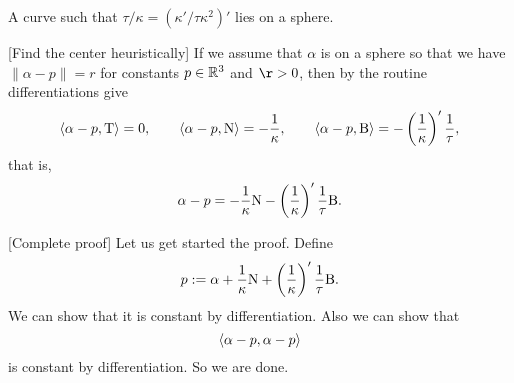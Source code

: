 \documentclass{../exp}
\def\a{\alpha}
\begin{document}
\begin{prb}
A curve such that $\tau/\kappa=(\kappa'/\tau\kappa^2)'$ lies on a sphere.
\end{prb}
\begin{sol}
[Find the center heuristically]
If we assume that $\a$ is on a sphere so that we have $\|\a-p\|=r$ for constants $p\in\mathbb{R}^3$ and $\r>0$, then by the routine differentiations give
\[\<\a-p,\rT\>=0,\qquad\<\a-p,\rN\>=-\frac1\kappa,\qquad\<\a-p,\rB\>=-\left(\frac1\kappa\right)'\frac1\tau,\]
that is,
\[\a-p=-\frac1\kappa\rN-\left(\frac1\kappa\right)'\frac1\tau\rB.\]

[Complete proof]
Let us get started the proof.
Define
\[p:=\a+\frac1\kappa\rN+\left(\frac1\kappa\right)'\frac1\tau\rB.\]
We can show that it is constant by differentiation.
Also we can show that
\[\<\a-p,\a-p\>\]
is constant by differentiation.
So we are done.
\end{sol}
\end{document}
